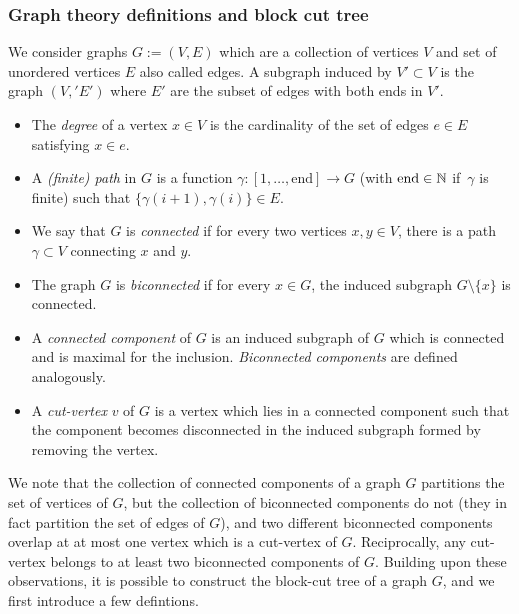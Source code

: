 \documentclass[12pt]{amsart}
\numberwithin{equation}{section}
\begin{document}
	
	
	
	
	
	\subsubsection{Graph theory definitions and block cut tree} \label{subsubsec:graph-theory-defs}
	We consider graphs $G := (V,E)$ which are a collection of vertices $V$
	and set of unordered vertices $E$ also called edges. A subgraph induced by $V' \subset V$ is the graph $(V,' E')$ where $E'$ are the subset of edges with both ends in $V'$. 
	
	\begin{itemize}
		\item The \emph{degree} of a vertex $x \in V$ is the cardinality of the set of edges $e \in E$ satisfying $x \in e$.
		
		\item A \emph{(finite) path} in $G$ is a function $\gamma : [1 , \ldots, \mathrm{end}] \to G$ (with $\mathrm{end} \in \operatorname{\mathbb{N}}$ if~$\gamma$ is finite) such that $\{ \gamma(i+1) , \gamma(i) \} \in E$.
		
		\item We say that $G$ is {\it connected} if for every two vertices 
		$x,y \in V$, there is a path  $\gamma \subset V$ connecting $x$ and $y$.
		\item The graph $G$ is {\it biconnected} if for every $x \in G$, the induced subgraph $G \setminus \{x\}$ is connected.
		\item A {\it connected component} of $G$ is an induced subgraph of $G$ which is connected
		and is maximal for the inclusion.  {\it Biconnected components} are defined analogously.
		
		\item A {\it cut-vertex} $v$ of $G$ is a vertex which lies in a connected component 
		such that the component becomes disconnected in the induced subgraph formed by removing the vertex.
		
	\end{itemize}
	
	
	
	We note that the collection of connected components of a graph $G$ partitions the set of vertices of $G$, but the collection of biconnected components do not (they in fact partition the set of edges of $G$), and two different biconnected components overlap at at most one vertex which is a cut-vertex of $G$. Reciprocally, any cut-vertex belongs to at least two biconnected components of $G$. Building upon these observations, it is possible to construct the block-cut tree of a graph $G$, and we first introduce a few defintions.
	
\end{document}
